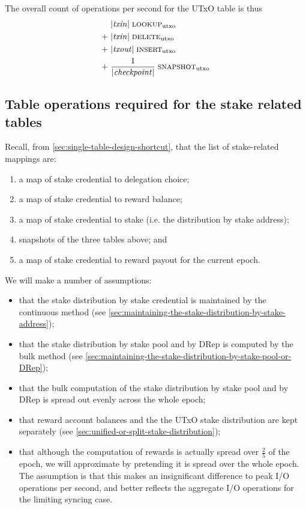 \documentclass[11pt,a4paper]{article}
\begin{document}
The overall count of operations per second for the UTxO table is thus
\begin{equation}\label{eq:utxo-ops}
\begin{aligned}
      & |\mathit{txin}| \; \text{{\sc lookup}}_\text{utxo} \\
 + \; & |\mathit{txin}| \; \text{{\sc delete}}_\text{utxo} \\
 + \; & |\mathit{txout}| \; \text{{\sc insert}}_\text{utxo} \\
 + \; & \frac{1}{|\mathit{checkpoint}|} \; \text{{\sc snapshot}}_\text{utxo} \\
\end{aligned}
\end{equation}

\subsection{Table operations required for the stake related tables}

Recall, from \cref{sec:single-table-design-shortcut}, that the list of
stake-related mappings are:
\begin{enumerate}
\item a map of stake credential to delegation choice;
\item a map of stake credential to reward balance;
\item a map of stake credential to stake (i.e. the distribution by stake address);
\item snapshots of the three tables above; and
\item a map of stake credential to reward payout for the current epoch.
\end{enumerate}
We will make a number of assumptions:
\begin{itemize}
\item that the stake distribution by stake credential is maintained by the
      continuous method
      (see \cref{sec:maintaining-the-stake-distribution-by-stake-address});
\item that the stake distribution by stake pool and by DRep is computed by the
      bulk method (see \cref{sec:maintaining-the-stake-distribution-by-stake-pool-or-DRep});
\item that the bulk computation of the stake distribution by stake pool and by
      DRep is spread out evenly across the whole epoch;
\item that reward account balances and the the UTxO stake distribution are kept
      separately (see \cref{sec:unified-or-split-stake-distribution});
\item that although the computation of rewards is actually spread over
      $\frac{2}{5}$ of the epoch, we will approximate by pretending it is
      spread over the whole epoch. The assumption is that this makes an
      insignificant difference to peak I/O operations per second, and better
      reflects the aggregate I/O operations for the limiting syncing case.
\end{itemize}
\end{document}
